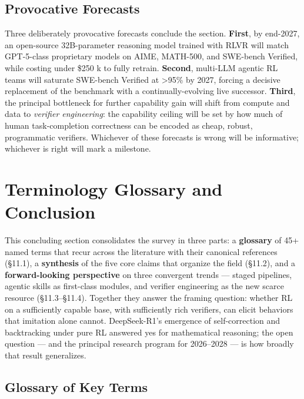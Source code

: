 \documentclass{article}
\begin{document}
\subsection{Provocative Forecasts}\label{provocative-forecasts}

Three deliberately provocative forecasts conclude the section. \textbf{First}, by end-2027, an open-source 32B-parameter reasoning model trained with RLVR will match GPT-5-class proprietary models on AIME, MATH-500, and SWE-bench Verified, while costing under \$250 k to fully retrain. \textbf{Second}, multi-LLM agentic RL teams will saturate SWE-bench Verified at \textgreater95\% by 2027, forcing a decisive replacement of the benchmark with a continually-evolving live successor. \textbf{Third}, the principal bottleneck for further capability gain will shift from compute and data to \emph{verifier engineering}: the capability ceiling will be set by how much of human task-completion correctness can be encoded as cheap, robust, programmatic verifiers. Whichever of these forecasts is wrong will be informative; whichever is right will mark a milestone.

\section{Terminology Glossary and Conclusion}\label{terminology-glossary-and-conclusion}

This concluding section consolidates the survey in three parts: a \textbf{glossary} of 45+ named terms that recur across the literature with their canonical references (§11.1), a \textbf{synthesis} of the five core claims that organize the field (§11.2), and a \textbf{forward-looking perspective} on three convergent trends --- staged pipelines, agentic skills as first-class modules, and verifier engineering as the new scarce resource (§11.3--§11.4). Together they answer the framing question: whether RL on a sufficiently capable base, with sufficiently rich verifiers, can elicit behaviors that imitation alone cannot. DeepSeek-R1's emergence of self-correction and backtracking under pure RL answered yes for mathematical reasoning; the open question --- and the principal research program for 2026--2028 --- is how broadly that result generalizes.

\subsection{Glossary of Key Terms}\label{glossary-of-key-terms}
\end{document}
